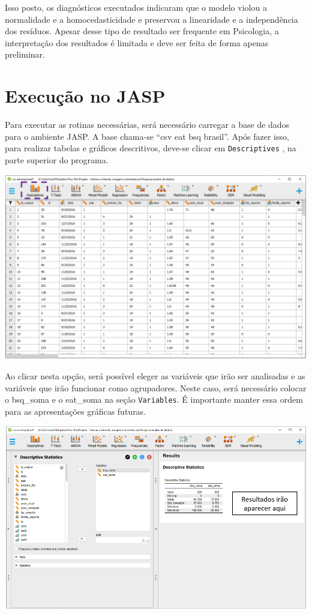 \documentclass[
]{book}
\begin{document}
Isso posto, os diagnósticos executados indicaram que o modelo violou a normalidade e a homocedasticidade e preservou a linearidade e a independência dos resíduos. Apesar desse tipo de resultado ser frequente em Psicologia, a interpretação dos resultados é limitada e deve ser feita de forma apenas preliminar.

\hypertarget{execuuxe7uxe3o-no-jasp-6}{%
\section{Execução no JASP}\label{execuuxe7uxe3o-no-jasp-6}}

Para executar as rotinas necessárias, será necessário carregar a base de dados para o ambiente JASP. A base chama-se ``csv eat bsq brasil''. Após fazer isso, para realizar tabelas e gráficos descritivos, deve-se clicar em \texttt{Descriptives} , na parte superior do programa.

\includegraphics{./img/cap_correlacao_descritivo.png}

Ao clicar nesta opção, será possível eleger as variáveis que irão ser analisadas e as variáveis que irão funcionar como agrupadores. Neste caso, será necessário colocar o bsq\_soma e o eat\_soma na seção \texttt{Variables}. É importante manter essa ordem para as apresentações gráficas futuras.

\includegraphics{./img/cap_reg_descritivo.png}
\end{document}
